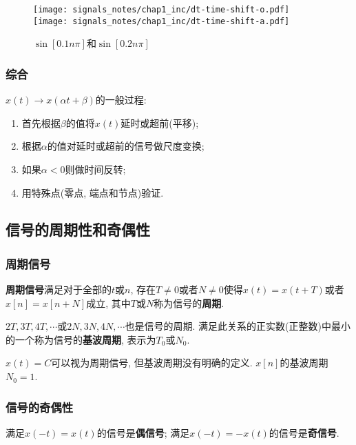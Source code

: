                 \begin{figure}[h]\centering
                    \texttt{[image: signals\_notes/chap1\_inc/dt-time-shift-o.pdf]} \raisebox{1.8cm}{$\to$} \texttt{[image: signals\_notes/chap1\_inc/dt-time-shift-a.pdf]}
                    \caption{$\sin[0.1n\pi]$和$\sin[0.2n\pi]$}
                    \label{fig:2:dt-time-shift-example}
                \end{figure}

        \subsubsection{综合}

            $x(t)\to x(\alpha t+\beta)$的一般过程:
            \begin{enumerate}
                \item 首先根据$\beta$的值将$x(t)$延时或超前(平移);
                \item 根据$\alpha$的值对延时或超前的信号做尺度变换;
                \item 如果$\alpha<0$则做时间反转;
                \item 用特殊点(零点, 端点和节点)验证.
            \end{enumerate}

    \subsection{信号的周期性和奇偶性}

        \subsubsection{周期信号}

            \textbf{周期信号}满足对于全部的$t$或$n$, 存在$T\neq 0$或者$N\neq 0$使得$x(t)=x(t+T)$或者$x[n]=x[n+N]$成立, 其中$T$或$N$称为信号的\textbf{周期}.

            $2T, 3T, 4T,\cdots$或$2N, 3N, 4N, \cdots$也是信号的周期. 满足此关系的正实数(正整数)中最小的一个称为信号的\textbf{基波周期}, 表示为$T_0$或$N_0$.

            $x(t)=C$可以视为周期信号, 但基波周期没有明确的定义. $x[n]$的基波周期$N_0=1$.

        \subsubsection{信号的奇偶性}

            满足$x(-t)=x(t)$的信号是\textbf{偶信号}; 满足$x(-t)=-x(t)$的信号是\textbf{奇信号}.

